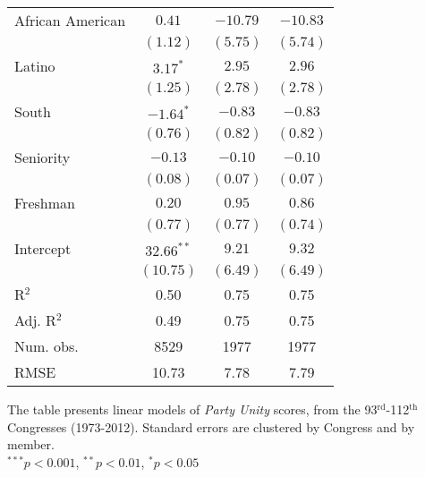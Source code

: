 \documentclass[12pt]{article}
\begin{document}
\begin{table}[!htbp]
\begin{threeparttable}
\begin{tabular}{l c c c }
African American      & $0.41$        & $-10.79$      & $-10.83$      \\
                      & $(1.12)$      & $(5.75)$      & $(5.74)$      \\
Latino                & $3.17^{*}$    & $2.95$        & $2.96$        \\
                      & $(1.25)$      & $(2.78)$      & $(2.78)$      \\
South                 & $-1.64^{*}$   & $-0.83$       & $-0.83$       \\
                      & $(0.76)$      & $(0.82)$      & $(0.82)$      \\
Seniority             & $-0.13$       & $-0.10$       & $-0.10$       \\
                      & $(0.08)$      & $(0.07)$      & $(0.07)$      \\
Freshman              & $0.20$        & $0.95$        & $0.86$        \\
                      & $(0.77)$      & $(0.77)$      & $(0.74)$      \\
Intercept             & $32.66^{**}$  & $9.21$        & $9.32$        \\
                      & $(10.75)$     & $(6.49)$      & $(6.49)$      \\
\hline
R$^2$                 & 0.50          & 0.75          & 0.75          \\
Adj. R$^2$            & 0.49          & 0.75          & 0.75          \\
Num. obs.             & 8529          & 1977          & 1977          \\
RMSE                  & 10.73         & 7.78          & 7.79          \\
\hline

\end{tabular}
\begin{tablenotes}
   \item
   The table presents linear models of \textit{Party Unity} scores,
   from the 93$^{\text{rd}}$-112$^{\text{th}}$ Congresses (1973-2012).
  Standard errors are clustered by Congress and by member.\\
   $^{***}p<0.001$, $^{**}p<0.01$, $^*p<0.05$
 \end{tablenotes}
\end{threeparttable}
\end{table}
\end{document}
